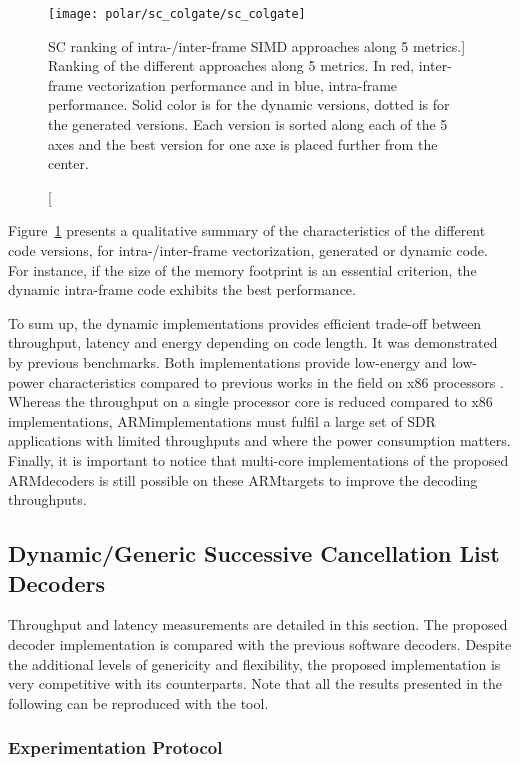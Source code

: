 \begin{figure}[htp]
  \centering
  \texttt{[image: polar/sc\_colgate/sc\_colgate]}
  \label{fig:eval_polar_sc_colgate}
  \caption
    [SC ranking of intra-/inter-frame SIMD approaches along 5 metrics.]
    {Ranking of the different approaches along
    5 metrics. In red, inter-frame vectorization performance and in blue,
    intra-frame performance. Solid color is for the dynamic versions, dotted is
    for the generated versions. Each version is sorted along each of the 5 axes
    and the best version for one axe is placed further from the center.}
\end{figure}

Figure~\ref{fig:eval_polar_sc_colgate} presents a qualitative summary of the
characteristics of the different code versions, for intra-/inter-frame
vectorization, generated or dynamic code. For instance, if the size of
the memory footprint is an essential criterion, the dynamic intra-frame
code exhibits the best performance.

To sum up, the dynamic implementations provides efficient trade-off between
throughput, latency and energy depending on code length. It was demonstrated by
previous benchmarks. Both implementations provide low-energy and low-power
characteristics compared to previous works in the field on x86 processors
\cite{Sarkis2014,Giard2014,Sarkis2014a,LeGal2014,LeGal2015a,Cassagne2015c}.
Whereas the throughput on a single processor core is reduced compared to x86
implementations, ARM\R implementations must fulfil a large set of SDR
applications with limited throughputs and where the power consumption matters.
Finally, it is important to notice that multi-core implementations of the
proposed ARM\R decoders is still possible on these ARM\R targets to improve the
decoding throughputs.

\subsection{Dynamic/Generic Successive Cancellation List Decoders}

Throughput and latency measurements are detailed in this section. The proposed
decoder implementation is compared with the previous software decoders. Despite
the additional levels of genericity and flexibility, the proposed implementation
is very competitive with its counterparts. Note that all the results presented
in the following can be reproduced with the \AFFECT tool.

\subsubsection{Experimentation Protocol}

